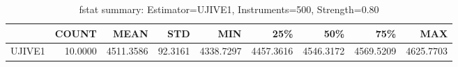 \begin{table}[ht]
\centering
\caption{fstat summary: Estimator=UJIVE1, Instruments=500, Strength=0.80}
\begin{tabular}{lrrrrrrrr}
\toprule
 & COUNT & MEAN & STD & MIN & 25\% & 50\% & 75\% & MAX \\
\midrule
UJIVE1 & 10.0000 & 4511.3586 & 92.3161 & 4338.7297 & 4457.3616 & 4546.3172 & 4569.5209 & 4625.7703 \\
\bottomrule
\end{tabular}
\end{table}
